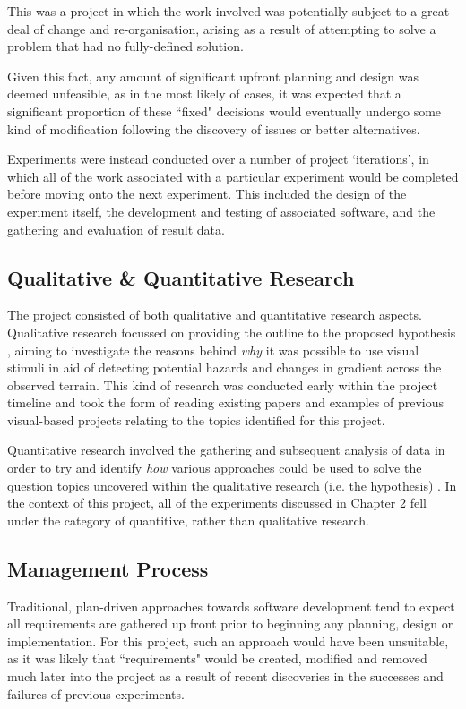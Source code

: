This was a project in which the work involved was potentially subject to a great deal of change and re-organisation, arising as a result of attempting to solve a problem that had no fully-defined solution. 

Given this fact, any amount of significant upfront planning and design was deemed unfeasible, as in the most likely of cases, it was expected that a significant proportion of these ``fixed" decisions would eventually undergo some kind of modification following the discovery of issues or better alternatives.

Experiments were instead conducted over a number of project `iterations', in which all of the work associated with a particular experiment would be completed before moving onto the next experiment. This included the design of the experiment itself, the development and testing of associated software, and the gathering and evaluation of result data. 

\subsection{Qualitative \& Quantitative Research}

The project consisted of both qualitative and quantitative research aspects. Qualitative research focussed on providing the outline to the proposed hypothesis \cite{research-types}, aiming to investigate the reasons behind \textit{why} it was possible to use visual stimuli in aid of detecting potential hazards and changes in gradient across the observed terrain. This kind of research was conducted early within the project timeline and took the form of reading existing papers and examples of previous visual-based projects relating to the topics identified for this project.

Quantitative research involved the gathering and subsequent analysis of data in order to try and identify \textit{how} various approaches could be used to solve the question topics uncovered within the qualitative research (i.e. the hypothesis) \cite{research-types}. In the context of this project, all of the experiments discussed in Chapter 2 fell under the category of quantitive, rather than qualitative research.

\subsection{Management Process}
\label{mgmt}

Traditional, plan-driven approaches towards software development tend to expect all requirements are gathered up front prior to beginning any planning, design or implementation. For this project, such an approach would have been unsuitable, as it was likely that ``requirements" would be created, modified and removed much later into the project as a result of recent discoveries in the successes and failures of previous experiments. 

